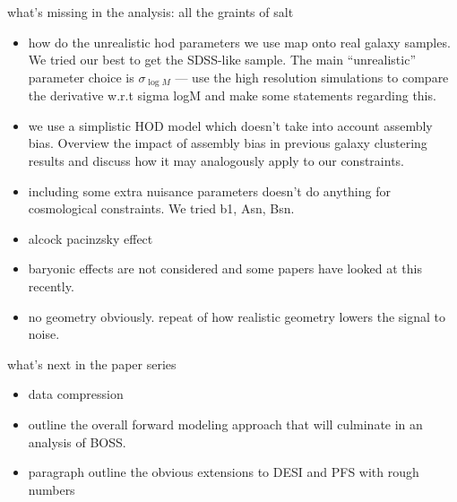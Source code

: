 what's missing in the analysis: all the graints of salt
\begin{itemize}
    \item how do the unrealistic hod parameters we use map onto real galaxy
        samples. We tried our best to get the SDSS-like sample. The main
        ``unrealistic'' parameter choice is $\sigma_{\log M}$ --- use the
        high resolution simulations to compare the derivative w.r.t sigma logM
        and make some statements regarding this. 
    \item we use a simplistic HOD model which doesn't take into account
        assembly bias. Overview the impact of assembly bias in previous galaxy
        clustering results and discuss how it may analogously apply to our
        constraints.
    \item including some extra nuisance parameters doesn't do anything for
        cosmological constraints. We tried b1, Asn, Bsn.  
    \item alcock pacinzsky effect
    \item baryonic effects are not considered and some papers have looked at
        this recently. 
    \item no geometry obviously. repeat of how realistic geometry lowers the
        signal to noise. 
\end{itemize}

what's next in the paper series 
\begin{itemize}
    \item data compression 
    \item outline the overall forward modeling approach that will culminate in
        an analysis of BOSS. 
    \item paragraph outline the obvious extensions to DESI and PFS with rough
        numbers 
\end{itemize}
